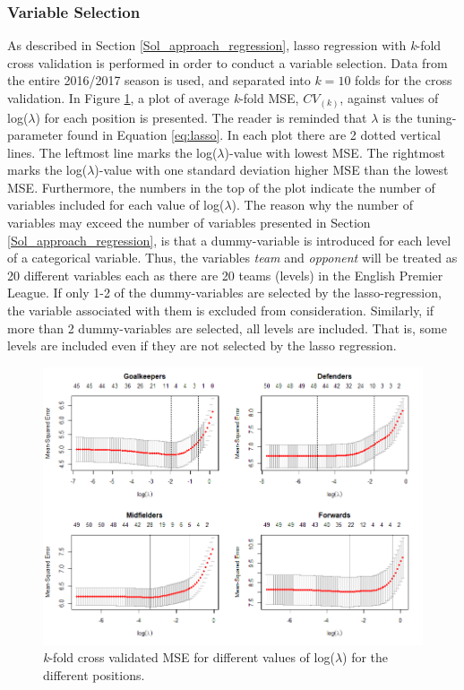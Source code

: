 \subsubsection{Variable Selection}

As described in Section \ref{Sol_approach_regression}, lasso regression with \textit{k}-fold cross validation is performed in order to conduct a variable selection. Data from the entire 2016/2017 season is used, and separated into $\textit{k}=10$ folds for the cross validation. In Figure \ref{fig:lasso_all}, a plot of average \textit{k}-fold MSE, $CV_{(k)}$, against values of log($\lambda$) for each position is presented. The reader is reminded that $\lambda$ is the tuning-parameter found in Equation \ref{eq:lasso}. In each plot there are 2 dotted vertical lines. The leftmost line marks the log($\lambda$)-value with lowest MSE. The rightmost marks the log($\lambda$)-value with one standard deviation higher MSE than the lowest MSE. Furthermore, the numbers in the top of the plot indicate the number of variables included for each value of log($\lambda$). The reason why the number of variables may exceed the number of variables presented in Section \ref{Sol_approach_regression}, is that a dummy-variable is introduced for each level of a categorical variable. Thus, the variables \textit{team} and \textit{opponent} will be treated as 20 different variables each as there are 20 teams (levels) in the English Premier League. If only 1-2 of the dummy-variables are selected by the lasso-regression, the variable associated with them is excluded from consideration. Similarly, if more than 2 dummy-variables are selected, all levels are included. That is, some levels are included even if they are not selected by the lasso regression.

\newpar

\begin{figure}[H]
    \centering
    \includegraphics[scale=0.55]{fig/chapter_6/lasso_all.png}
    \caption{\textit{k}-fold cross validated MSE for different values of log($\lambda$) for the different positions.}
\label{fig:lasso_all}    
\end{figure}

